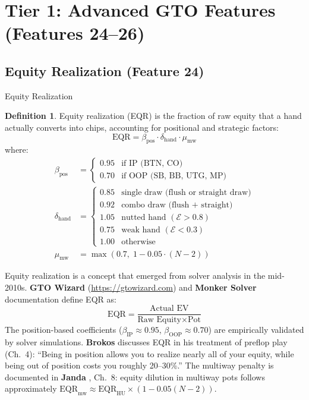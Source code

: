 \documentclass[11pt, a4paper]{article}
\theoremstyle{definition}
\newtheorem{definition}{Definition}[section]
\begin{document}
\section{Tier 1: Advanced GTO Features (Features 24--26)}

\subsection{Equity Realization (Feature 24)}

\begin{featurebox}{Equity Realization}
\begin{definition}
Equity realization (EQR) is the fraction of raw equity that a hand actually converts into chips, accounting for positional and strategic factors:
\begin{equation}
    \boxed{\text{EQR} = \beta_{\text{pos}} \cdot \delta_{\text{hand}} \cdot \mu_{\text{mw}}}
\end{equation}
where:
\begin{align}
    \beta_{\text{pos}} &= \begin{cases} 0.95 & \text{if IP (BTN, CO)} \\ 0.70 & \text{if OOP (SB, BB, UTG, MP)} \end{cases} \\[6pt]
    \delta_{\text{hand}} &= \begin{cases}
        0.85 & \text{single draw (flush or straight draw)} \\
        0.92 & \text{combo draw (flush + straight)} \\
        1.05 & \text{nutted hand } (\mathcal{E} > 0.8) \\
        0.75 & \text{weak hand } (\mathcal{E} < 0.3) \\
        1.00 & \text{otherwise}
    \end{cases} \\[6pt]
    \mu_{\text{mw}} &= \max\!\left(0.7,\; 1 - 0.05 \cdot (N - 2)\right)
\end{align}
\end{definition}
\end{featurebox}

\begin{refbox}
Equity realization is a concept that emerged from solver analysis in the mid-2010s. \textbf{GTO Wizard} (\url{https://gtowizard.com}) and \textbf{Monker Solver} documentation define EQR as:
\[
    \text{EQR} = \frac{\text{Actual EV}}{\text{Raw Equity} \times \text{Pot}}
\]
The position-based coefficients ($\beta_{\text{IP}} \approx 0.95$, $\beta_{\text{OOP}} \approx 0.70$) are empirically validated by solver simulations. \textbf{Brokos} \cite{brokos2014} discusses EQR in his treatment of preflop play (Ch.~4): ``Being in position allows you to realize nearly all of your equity, while being out of position costs you roughly 20--30\%.'' The multiway penalty is documented in \textbf{Janda} \cite{janda2017}, Ch.~8: equity dilution in multiway pots follows approximately $\text{EQR}_{\text{mw}} \approx \text{EQR}_{\text{HU}} \times (1 - 0.05(N-2))$.
\end{refbox}
\end{document}

